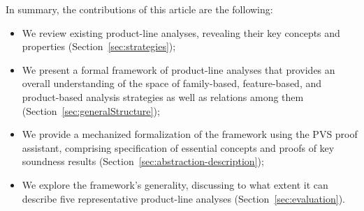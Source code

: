 In summary, the contributions of this article are the following:
\begin{itemize}
    \item We review existing product-line analyses, revealing their key concepts and properties  (Section~\ref{sec:strategies});
	\item We present a formal framework of product-line analyses that provides an overall understanding of the space of family-based, feature-based, and product-based analysis strategies as well as relations among them (Section~\ref{sec:generalStructure});
	\item We provide a mechanized formalization of the framework using the PVS proof assistant, comprising specification of essential concepts and proofs of key soundness results (Section~\ref{sec:abstraction-description});
	\item We explore the framework's generality, discussing to what extent it can describe five representative product-line analyses (Section~\ref{sec:evaluation}).
\end{itemize}

